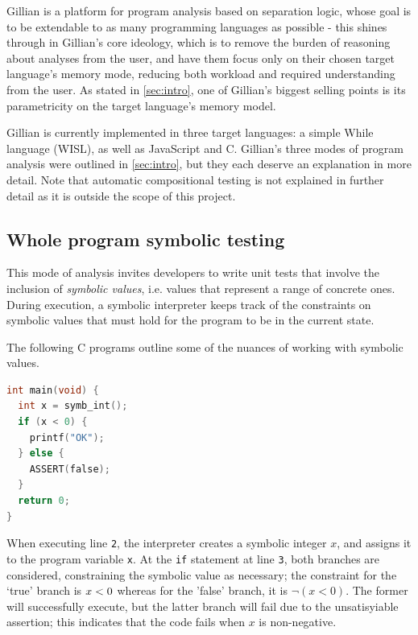 Gillian is a platform for program analysis based on separation logic, whose
goal is to be extendable to as many programming languages as possible - this
shines through in Gillian's core ideology, which is to remove the burden of
reasoning about analyses from the user, and have them focus only on their
chosen target language's memory mode, reducing both workload and required
understanding from the user. As stated in \autoref{sec:intro}, one of
Gillian's biggest selling points is its parametricity on the target language's
memory model.

Gillian is currently implemented in three target languages: a simple While
language (WISL), as well as JavaScript and C. Gillian's three modes of program
analysis were outlined in \autoref{sec:intro}, but they each deserve an explanation in more detail. Note that automatic compositional testing is not explained in further detail as it is outside the scope of this project.

\subsection{Whole program symbolic testing}

This mode of analysis invites developers to write unit tests that involve the
inclusion of \textit{symbolic values}, i.e. values that represent a range of
concrete ones. During execution, a symbolic interpreter keeps track of the
constraints on symbolic values that must hold for the program to be in the
current state.

The following C programs outline some of the nuances of working with symbolic
values.

\begin{lstlisting}[caption={Symbolic execution - basic example}, style=code, language=C]
int main(void) {
  int x = symb_int();
  if (x < 0) {
    printf("OK");
  } else {
    ASSERT(false);
  }
  return 0;
}
\end{lstlisting}

When executing line \texttt{2}, the interpreter creates a symbolic integer $x$,
and assigns it to the program variable \texttt{x}. At the \texttt{if} statement
at line \texttt{3}, both branches are considered, constraining the symbolic
value as necessary; the constraint for the `true' branch is \texttt{$x < 0$}
whereas for the 'false' branch, it is \texttt{$\lnot (x < 0)$}. The former will
successfully execute, but the latter branch will fail due to the unsatisyiable
assertion; this indicates that the code fails when $x$ is non-negative.

